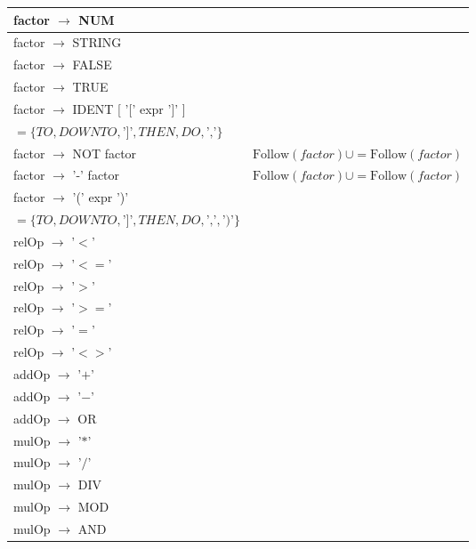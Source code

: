 \documentclass[8pt]{scrartcl}
\newcommand{\First}[1]{\mathrm{First}(#1)}
\newcommand{\Follow}[1]{\mathrm{Follow}(#1)}
\newcommand{\epsset}{\{\varepsilon\}}
\begin{document}
\begin{itemize}
\begin{tabular}{|l|l|}
                    \hline
                    factor $\rightarrow$ NUM &\\
                    \hline
                    factor $\rightarrow$ STRING &\\
                    \hline
                    factor $\rightarrow$ FALSE &\\
                    \hline
                    factor $\rightarrow$ TRUE &\\
                    \hline
                    factor $\rightarrow$ IDENT [ '[' expr ']' ] & \makecell[l]{$\Follow{expr} \cup = \First{\text{']'}} \setminus \epsset $\\$= \{TO, DOWNTO, \text{']'}, THEN, DO, \text{','}\}$} \\
                    \hline
                    factor $\rightarrow$ NOT factor & $\Follow{factor} \cup = \Follow{factor}$\\
                    \hline
                    factor $\rightarrow$ '-' factor & $\Follow{factor} \cup = \Follow{factor}$\\
                    \hline
                    factor $\rightarrow$ '(' expr ')' & \makecell[l]{$\Follow{expr} \cup = \First{\text{'$)$'}} \setminus \epsset $\\ $= \{TO, DOWNTO, \text{']'}, THEN, DO, \text{','}, \text{'$)$'}\}$}\\
                    \hline
                    relOp $\rightarrow$ '$<$' & \\
                    \hline
                    relOp $\rightarrow$ '$<=$' & \\
                    \hline
                    relOp $\rightarrow$ '$>$' & \\
                    \hline
                    relOp $\rightarrow$ '$>=$' & \\
                    \hline
                    relOp $\rightarrow$ '$=$' & \\
                    \hline
                    relOp $\rightarrow$ '$<>$' & \\
                    \hline
                    addOp $\rightarrow$ '$+$' & \\
                    \hline
                    addOp $\rightarrow$ '$-$' & \\
                    \hline
                    addOp $\rightarrow$ OR & \\
                    \hline
                    mulOp $\rightarrow$ '$*$' & \\
                    \hline
                    mulOp $\rightarrow$ '$/$' & \\
                    \hline
                    mulOp $\rightarrow$ DIV & \\
                    \hline
                    mulOp $\rightarrow$ MOD & \\
                    \hline
                    mulOp $\rightarrow$ AND & \\
                \end{tabular}
        \end{itemize}
\end{document}
